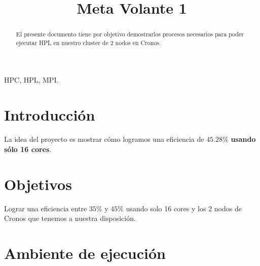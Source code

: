 \documentclass[conference]{IEEEtran}
\begin{document}
\title{Meta Volante 1}

\author{
\and
{}
\and
{}
\and
{}
}

\maketitle

\begin{abstract}
El presente documento tiene por objetivo demostrarlos procesos necesarios para poder ejecutar HPL en
nuestro cluster de 2 nodos en Cronos. 
\end{abstract}

\begin{IEEEkeywords}
HPC, HPL, MPI.
\end{IEEEkeywords}

\section{Introducción}
La idea del proyecto es mostrar cómo logramos una eficiencia de \( 45.28\% \) 
\textbf{usando sólo 16 cores}.

\section{Objetivos}
Lograr una eficiencia entre \( 35\% \) y \( 45\% \) usando solo 16 cores y los 2 nodos de Cronos que 
tenemos a nuestra disposición.

\section{Ambiente de ejecución}
\end{document}
